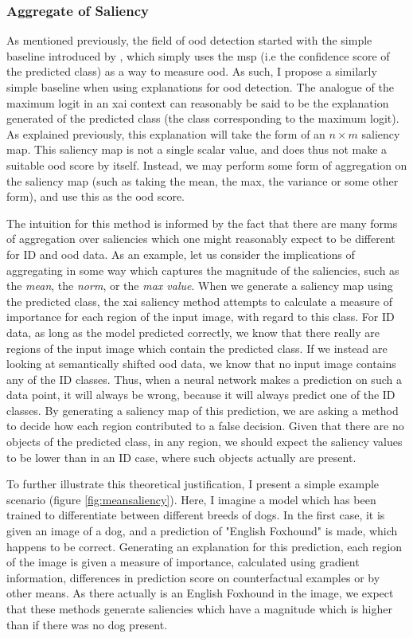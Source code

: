\documentclass[UKenglish]{uiomasterthesis} %
\theoremstyle{definition}
\begin{document}
\subsubsection{Aggregate of Saliency}

As mentioned previously, the field of \ac{ood} detection started with the simple baseline introduced by \cite{oodbaseline}, which simply uses the \ac{msp} (i.e the confidence score of the predicted class) as a way to measure \ac{ood}. As such, I propose a similarly simple baseline when using explanations for \ac{ood} detection. The analogue of the maximum logit in an \ac{xai} context can reasonably be said to be the explanation generated of the predicted class (the class corresponding to the maximum logit). As explained previously, this explanation will take the form of an $n \times m$ saliency map. This saliency map is not a single scalar value, and does thus not make a suitable \ac{ood} score by itself. Instead, we may perform some form of aggregation on the saliency map (such as taking the mean, the max, the variance or some other form), and use this as the \ac{ood} score.

The intuition for this method is informed by the fact that there are many forms of aggregation over saliencies which one might reasonably expect to be different for ID and \ac{ood} data. As an example, let us consider the implications of aggregating in some way which captures the magnitude of the saliencies, such as the {\it mean}, the {\it norm}, or the {\it max value}. When we generate a saliency map using the predicted class, the \ac{xai} saliency method attempts to calculate a measure of importance for each region of the input image, with regard to this class. For ID data, as long as the model predicted correctly, we know that there really are regions of the input image which contain the predicted class. If we instead are looking at semantically shifted \ac{ood} data, we know that no input image contains any of the ID classes. Thus, when a neural network makes a prediction on such a data point, it will always be wrong, because it will always predict one of the ID classes. By generating a saliency map of this prediction, we are asking a method to decide how each region contributed to a false decision. Given that there are no objects of the predicted class, in any region, we should expect the saliency values to be lower than in an ID case, where such objects actually are present.

To further illustrate this theoretical justification, I present a simple example scenario (figure \ref{fig:meansaliency}). Here, I imagine a model which has been trained to differentiate between different breeds of dogs. In the first case, it is given an image of a dog, and a prediction of "English Foxhound" is made, which happens to be correct. Generating an explanation for this prediction, each region of the image is given a measure of importance, calculated using gradient information, differences in prediction score on counterfactual examples or by other means. As there actually is an English Foxhound in the image, we expect that these methods generate saliencies which have a magnitude which is higher than if there was no dog present.
\end{document}
